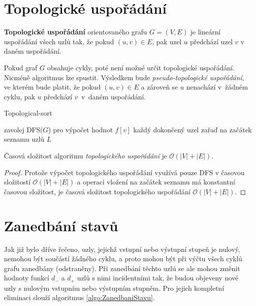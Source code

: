     \section{Topologické uspořádání}
        \begin{definition}
            \textbf{Topologické uspořádání} orientovaného grafu $G = (V, E)$ je lineární uspořádání všech uzlů tak, že pokud $(u, v) \in E$, pak uzel $u$ předchází uzel $v$ v daném uspořádání.
        \end{definition}

        \vspace*{1em}
        Pokud graf $G$ obsahuje cykly, poté není možné určit topologické uspořádání. Nicméně algoritmus lze spustit. Výsledkem bude \textit{pseudo-topologické uspořádání}, ve kterém bude platit, že pokud $(u, v) \in E$ a zároveň se $u$ nenachází v~žádném cyklu, pak $u$ předchází $v$~v~daném uspořádání.

        \begin{algorithm}
            \DontPrintSemicolon
            \caption{Topological-sort}
            \vspace*{0.5em}

            zavolej DFS($G$) pro výpočet hodnot $f[v]$\;
            každý dokončený uzel zařaď na začátek seznamu uzlů $L$\;
            \vspace*{0.5em}

        \end{algorithm}

        \begin{theorem}
            Časová složitost algoritmu \textit{topologického uspořádání} je $\mathcal{O}(|V| + |E|)$.
        \end{theorem}
        \begin{proof}
            Protože výpočet topologického uspořádání využívá pouze DFS v časovou složitostí $\mathcal{O}(|V| + |E|)$ a operaci vložení na začátek seznamu má konstantní časovou složitost, je časová složitost topologického uspořádání $\mathcal{O}(|V| + |E|)$.
        \end{proof}

    \section{Zanedbání stavů}

        Jak již bylo dříve řečeno, uzly, jejichž vstupní nebo výstupní stupeň je nulový, nemohou být součástí žádného cyklu, a proto mohou být při výčtu všech cyklů grafu zanedbány (odstraněny). Při zanedbání těchto uzlů se ale mohou změnit hodnoty funkcí $d_-$ a $d_+$ uzlů s nimi incidentními tak, že budou objeveny nové uzly s nulovým vstupním nebo výstupním stupněm. Pro jejich kompletní eliminaci slouží algoritmus \ref{algo:ZanedbaniStavu}.

